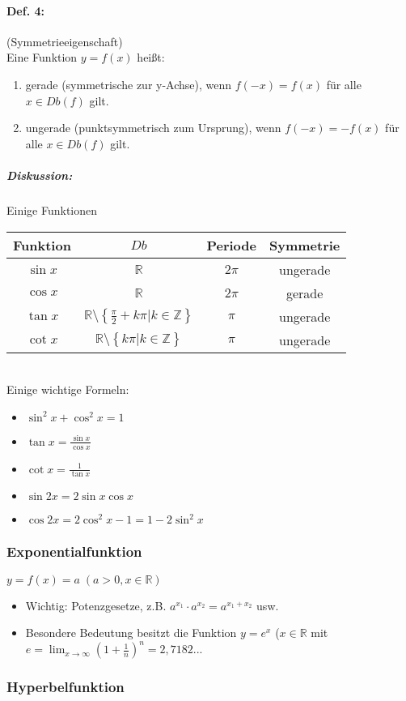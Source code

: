 \paragraph{Def. 4:} (Symmetrieeigenschaft)\\
Eine Funktion $y=f(x)$ heißt:
\begin{enumerate}
\item gerade (symmetrische zur y-Achse), wenn $f(-x)=f(x)$ für alle $x\in Db(f)$ gilt.
\item ungerade (punktsymmetrisch zum Ursprung), wenn $f(-x)=-f(x)$ für alle $x\in Db(f)$ gilt.
\end{enumerate}
\subparagraph{Diskussion:} \parskp
Einige Funktionen
\begin{tabular}{c c c c}
Funktion & $Db$ & Periode & Symmetrie\\
\hline
$\sin x$ & $\mathbb{R}$ & $2\pi$ & ungerade\\
$\cos x$ & $\mathbb{R}$ & $2\pi$ & gerade\\
$\tan x$ & $\mathbb{R}\setminus \left\lbrace\frac{\pi}{2}+k\pi | k\in \mathbb{Z}\right\rbrace$ & $\pi$ & ungerade\\
$\cot x$ & $\mathbb{R}\setminus \left\lbrace k\pi | k\in \mathbb{Z}\right\rbrace$ & $\pi$ & ungerade\\
\end{tabular}\\
Einige wichtige Formeln:
\begin{itemize}
\item $\sin^2 x+\cos^2 x = 1$
\item $\tan x = \frac{\sin x}{\cos x}$
\item $\cot x=\frac{1}{\tan x}$
\item $\sin 2x=2\sin x \cos x$
\item $\cos 2x=2 \cos^2x-1=1-2\sin^2x$
\end{itemize}
\subsubsection{Exponentialfunktion}
$y=f(x)=a\; (a>0, x\in \mathbb{R})$
\begin{itemize}
\item Wichtig: Potenzgesetze, z.B. $a^{x_1}\cdot a^{x_2}=a^{x_1+x_2}$ usw.
\item Besondere Bedeutung besitzt die Funktion $y=e^x$ ($x\in \mathbb{R}$ mit $e=\lim_{x\to \infty} \left( 1+\frac{1}{n}\right)^n=2,7182...$
\end{itemize}
\subsubsection{Hyperbelfunktion}
